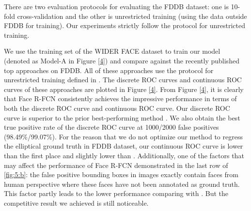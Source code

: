 \documentclass{article} \usepackage{nips13submit_e,times}
\newcommand{\ignore}[1]{}
\begin{document}
There are two evaluation protocols for evaluating the FDDB dataset: one is 10-fold cross-validation and the other is unrestricted training (using the data outside FDDB for training). Our experiments strictly follow the protocol for unrestricted training.


\begin{figure*}
  \centering


  \caption{Evaluation of our results on the FDDB published methods. We show the ROC curves on the (a) Discrete ROC curve and (b) Continuous ROC curve.
Model-A and Model-B is trained by WIDER FACE's training set and a augmented private dataset respectively. We show the true positive rate at 2000 false positives for each model. Best viewed in color.}\label{4}
\end{figure*}

We use the training set of the WIDER FACE dataset to train our model (denoted as Model-A in Figure \ref{4}) and compare against the recently published top approaches \cite{sfd,HR,spl,ldcf,conv3d,mxnet} on FDDB. All of these approaches use the protocol for unrestricted training defined in \cite{fddb}. The discrete ROC curves and continuous ROC curves of these approaches are plotted in Figure \ref{4}. From Figure \ref{4}, it is clearly that Face R-FCN consistently achieves the impressive\ignore{state-of-the-art} performance in terms of both the discrete ROC curve and continuous ROC curve. Our discrete ROC curve is superior to the prior best-performing method\ignore{one} \cite{sfd,facercnn}. We also obtain the best true positive rate of the discrete ROC curve at 1000/2000 false positives (98.49\%/99.07\%). For the reason that we do not optimize our method to regress the elliptical ground truth in FDDB dataset, our continuous ROC curve is lower than the first place \cite{sfd} and slightly lower than \cite{facercnn,conv3d}. Additionally, one of the factors that may affect the performance of Face R-FCN demonstrated in the last row of \ref{fig:5:b}: the false positive bounding boxes in images exactly contain faces from human perspective where these faces have not been annotated as ground truth. This factor partly leads to the lower performance comparing with \cite{facercnn,conv3d,sfd}. But the competitive result we achieved is still noticeable.  
\end{document}
